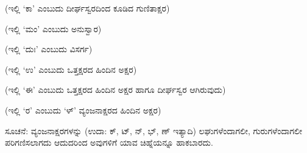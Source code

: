 \vspace{2.5pt plus 3pt minus 0.5pt}\noindent\hspace*{1.2em}\hspace{0.55em}\guru{}\laghu{}\laghu{} (ಇಲ್ಲಿ ‘ಕಾ’ ಎಂಬುದು ದೀರ್ಘಸ್ವರದಿಂದ ಕೂಡಿದ ಗುಣಿತಾಕ್ಷರ)\par

\vspace{2.5pt plus 3pt minus 0.5pt}\noindent\hspace*{1.2em}\hspace{0.55em}\guru{}\laghu{}\laghu{} (ಇಲ್ಲಿ ‘ಮಂ’ ಎಂಬುದು ಅನುಸ್ವಾರ)\par

\vspace{2.5pt plus 3pt minus 0.5pt}\noindent\hspace*{1.2em}\hspace{0.55em}\guru{} (ಇಲ್ಲಿ ‘ದುಃ’ ಎಂಬುದು ವಿಸರ್ಗ)\par

\vspace{2.5pt plus 3pt minus 0.5pt}\noindent\hspace*{1.2em}\hspace{0.55em}\guru{}\laghu{}\laghu{} (ಇಲ್ಲಿ ‘ಉ’ ಎಂಬುದು ಒತ್ತಕ್ಷರದ ಹಿಂದಿನ ಅಕ್ಷರ)\par

\vspace{2.5pt plus 3pt minus 0.5pt}\noindent\hspace*{1.2em}\hspace{0.55em}\guru{}\laghu{}\laghu{} (ಇಲ್ಲಿ ‘ಈ’ ಎಂಬುದು ಒತ್ತಕ್ಷರದ ಹಿಂದಿನ ಅಕ್ಷರ ಹಾಗೂ ದೀರ್ಘಸ್ವರ ಆಗಿರುವುದು)\par

\vspace{2.5pt plus 3pt minus 0.5pt}\noindent\hspace*{1.2em}\hspace{0.55em}\laghu{}\guru{} (ಇಲ್ಲಿ ‘ರ’ ಎಂಬುದು ‘ಳ್’ ವ್ಯಂಜನಾಕ್ಷರದ ಹಿಂದಿನ ಅಕ್ಷರ)\par

\indent ಸೂಚನೆ: ವ್ಯಂಜನಾಕ್ಷರಗಳನ್ನು (ಉದಾ: ಕ್, ಟ್, ನ್, ಭ್, ಣ್ ಇತ್ಯಾದಿ) ಲಘುಗಳೆಂದಾಗಲೀ, ಗುರುಗಳೆಂದಾಗಲೀ ಪರಿಗಣಿಸಲಾಗದು ಆದುದರಿಂದ ಅವುಗಳಿಗೆ ಯಾವ ಚಿಹ್ನೆಯನ್ನೂ ಹಾಕಬಾರದು.\par

